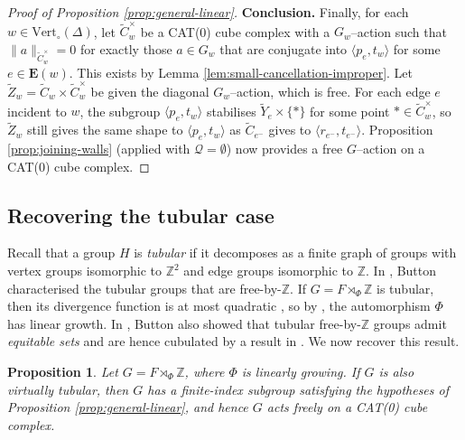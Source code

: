 \documentclass[11pt,oneside]{amsart}
\newtheorem{prop}[thm]{Proposition}
\theoremstyle{definition}
\newcommand{\field}[1]{\mathbb{#1}}
\newcommand{\integers}{\ensuremath{\field{Z}}}
\newcommand{\vertices}{\mathrm{Vert}}
\begin{document}
\begin{proof}[Proof of Proposition \ref{prop:general-linear}]
\textbf{Conclusion.}  Finally, for each $w\in\vertices_\circ(\Delta)$, let $\widetilde C^\times_w$ be a CAT(0) cube complex with a $G_w$--action such that $\|a\|_{\widetilde C^\times_w}=0$ for exactly those $a\in G_w$ that are conjugate into $\langle p_e,t_w\rangle$ for some $e\in\mathbf E(w)$.  This exists by Lemma \ref{lem:small-cancellation-improper}.  Let $\widetilde Z_w=\widetilde C_w\times \widetilde C^\times_w$ be given the diagonal $G_w$--action, which is free.  For each edge $e$ incident to $w$, the subgroup $\langle p_e,t_w\rangle$ stabilises $\widetilde Y_e\times\{*\}$ for some point $*\in\widetilde C_w^\times$, so $\widetilde Z_w$ still gives the same shape to $\langle p_e,t_w\rangle$ as $\widetilde C_{e^-}$ gives to $\langle r_{e^-},t_{e^-}\rangle$.  Proposition \ref{prop:joining-walls} (applied with $\mathcal Q=\emptyset$) now provides a free $G$--action on a CAT(0) cube complex.
\renewcommand{\qedsymbol}{$\Box$}
\end{proof}

\subsection{Recovering the tubular case}\label{subsec:tubular-recovery}
Recall that a group $H$ is \emph{tubular} if it decomposes as a finite graph of groups with vertex groups isomorphic to $\integers^2$ and edge groups isomorphic to $\integers$. In \cite{Button:tubular-cubes}, Button characterised the tubular groups that are free-by-$\integers$.  If $G=F\rtimes_\Phi\integers$ is tubular, then its divergence function is at most quadratic \cite{BehrstockDrutu:short}, so by \cite{Macura:detour}, the automorphism $\Phi$ has linear growth.  In \cite{Button:tubular-cubes}, Button also showed that tubular free-by-$\integers$ groups admit \emph{equitable sets} and are hence cubulated by a result in \cite{Wise:tubular}.  We now  recover this result.

\begin{prop}\label{prop:tubular-cubulation}
Let $G=F\rtimes_\Phi\integers$, where $\Phi$ is linearly growing.  If $G$ is also virtually tubular, then $G$ has a finite-index subgroup satisfying the hypotheses of Proposition \ref{prop:general-linear}, and hence $G$ acts freely on a CAT(0) cube complex.
\end{prop}
\end{document}
